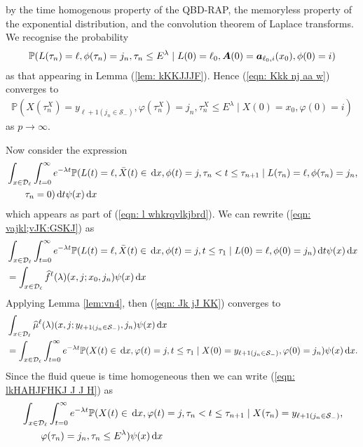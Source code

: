 by the time homogenous property of the QBD-RAP, the memoryless property of the exponential distribution, and the convolution theorem of Laplace transforms. We recognise the probability 
\begin{align}
	\mathbb P(L(\tau_n) = \ell, \phi(\tau_n) = j_n, \tau_{n}\leq E^\lambda 
	 \mid L(0)=\ell_0, \boldsymbol A(0)=\boldsymbol  a_{\ell_0,i}(x_0), \phi(0)=i) \label{eqn: Kkk nj aa w}
\end{align}
as that appearing in Lemma (\ref{lem: kKKJJJF}). Hence (\ref{eqn: Kkk nj aa w}) converges to 
\begin{align}
	\mathbb P(X(\tau_n^X) = y_{\ell+1(j_{n}\in\mathcal S_-)}, 
		\varphi(\tau_n^X) = j_n, \tau_{n}^X\leq E^\lambda
		\mid X(0)=x_0, \varphi(0)=i)
\end{align}
as \(p\to\infty\). 

Now consider the expression 
\begin{align}
	&\int_{x\in\mathcal{D}_\ell} \int_{t=0}^\infty e^{-\lambda t} \mathbb P(L(t) = \ell, \bar X(t) \in \, \mathrm{d} x, \phi(t) = j, 
	\tau_n<t \leq \tau_{n+1} \mid L(\tau_n) = \ell, \nonumber 
	 \phi(\tau_n) = j_n,
	 	\\&\qquad{} \tau_{n}= 0)\, \mathrm{d} t  \psi(x)\, \mathrm{d} x \label{eqn: vajkl;vJK:GSKJ}
\end{align}
which appears as part of (\ref{eqn: l whkrqvlkjbrd}). We can rewrite (\ref{eqn: vajkl;vJK:GSKJ}) as  
\begin{align}
	 &\int_{x\in\mathcal{D}_\ell} \int_{t=0}^\infty e^{-\lambda t} \mathbb P(L(t) = \ell, \bar X(t) \in \, \mathrm{d} x, \phi(t) = j, 
	t \leq \tau_{1} \mid L(0) = \ell, \nonumber 
	 \phi(0) = j_n)\, \mathrm{d} t \psi(x)\, \mathrm{d} x
	 \\&= \int_{x\in\mathcal{D}_\ell} \widehat f^{\ell} (\lambda)(x,j;x_0,j_n) \psi(x)\, \mathrm{d} x \label{eqn: Jk jJ KK}
\end{align}
Applying Lemma \ref{lem:vn4}, then (\ref{eqn: Jk jJ KK}) converges to 
\begin{align}
	&\int_{x\in\mathcal{D}_\ell} \widehat \mu^{\ell} (\lambda)(x,j;y_{\ell+1(j_n\in\mathcal S_-)},j_n) \psi(x)\, \mathrm{d} x \nonumber 
	\\&= \int_{x\in\mathcal{D}_\ell} \int_{t=0}^\infty e^{-\lambda t}\mathbb P(X(t)\in\, \mathrm{d} x, \varphi(t)=j, t\leq \tau_1 \mid X(0) = y_{\ell+1(j_n\in\mathcal S_-)}, \varphi(0)=j_n ) \psi(x)\, \mathrm{d} x. \label{eqn: lkHAHJFHKJ J J H}
\end{align}
Since the fluid queue is time homogeneous then we can write (\ref{eqn: lkHAHJFHKJ J J H}) as 
\begin{align}
	&\int_{x\in\mathcal{D}_\ell} \int_{t=0}^\infty e^{-\lambda t} \mathbb P(X(t)\in\, \mathrm{d} x, \varphi(t)=j, \tau_n < t \leq \tau_{n+1} \mid X(\tau_n) = y_{\ell+1(j_n\in\mathcal S_-)}, \nonumber 
	\\&\qquad{} \varphi(\tau_n)=j_n, \tau_n\leq E^\lambda ) \psi(x)\, \mathrm{d} x \label{eqn: lkHAHJFHKJ J J 22}
\end{align}

